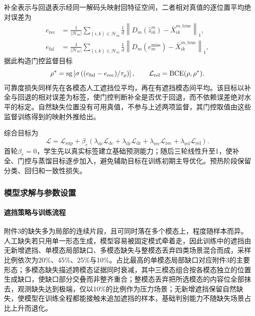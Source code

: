 补全表示与回退表示经同一解码头映射回特征空间，二者相对真值的逐位置平均绝对误差为
\begin{equation}
\begin{aligned}
e_{\mathrm{rec}}&=\frac{1}{|\mathcal H_m|}\sum_{(i,k)\in\mathcal H_m}\frac{1}{d}\left\|D_m(\hat z^m_{ik})-\bar X^{m,\mathrm{true}}_{ik}\right\|_1,\\
e_{\mathrm{fal}}&=\frac{1}{|\mathcal H_m|}\sum_{(i,k)\in\mathcal H_m}\frac{1}{d}\left\|D_m(e_m^{\mathrm{miss}})-\bar X^{m,\mathrm{true}}_{ik}\right\|_1,
\end{aligned}
\end{equation}
据此构造门控监督目标
\begin{equation}
\rho^*=\operatorname{sg}\left[\sigma\left((e_{\mathrm{fal}}-e_{\mathrm{rec}})/\tau_{\rho}\right)\right],\qquad
\mathcal L_{\mathrm{rel}}=\operatorname{BCE}(\rho,\rho^*).
\end{equation}
可靠度损失同样先在各模态人工遮挡位平均，再在有遮挡模态间平均。该目标以补全与回退的相对误差为标签，使门控判断补全是否优于回退，而不依赖误差绝对水平的标定。自然缺失位置没有可用真值，不参与上述两项监督，其门控取值由这些监督训练得到的映射外推给出。

综合目标为
\begin{equation}
\label{q2:eq:total_loss}
\mathcal L=\mathcal L_{\mathrm{sup}}+\beta_e\left(
\lambda_{\mathrm{dc}}\mathcal L_{\mathrm{dc}}+
\lambda_{\mathrm{dr}}\mathcal L_{\mathrm{dr}}+
\lambda_{\mathrm{rec}}\mathcal L_{\mathrm{rec}}+
\lambda_{\mathrm{rel}}\mathcal L_{\mathrm{rel}}\right).
\end{equation}
首轮$\beta_e=0$，学生先以真实标签建立基础预测能力；随后三轮线性升至1，使补全、门控与蒸馏目标逐步加入，避免辅助目标在训练初期主导优化。预热阶段保留分类、回归和一致性损失。

\subsubsection{模型求解与参数设置}
\paragraph{遮挡策略与训练流程}
附件3的缺失多为局部的连续片段，且可同时落在多个模态上，程度随样本而异。人工缺失若只用单一形态生成，模型容易被固定模式牵着走，因此训练中的遮挡由无新增遮挡、单模态局部缺口、多模态缺失与整模态丢弃四类场景混合而成，采样比例依次为20\%、45\%、25\%与10\%。占比最高的单模态局部缺口对应附件3的主要形态；多模态缺失描述跨模态证据同时衰减，其中三模态组合按各模态独立的位置生成缺口，使缺口部分交叠而非整齐重合；整模态丢弃把所选模态的内容位全部抹去，观测缺失达到极端，仅以10\%的比例作为压力场景；无新增遮挡保留自然缺失，使模型在训练全程都能接触未追加遮挡的样本，基础判别能力不随缺失场景占比上升而退化。

